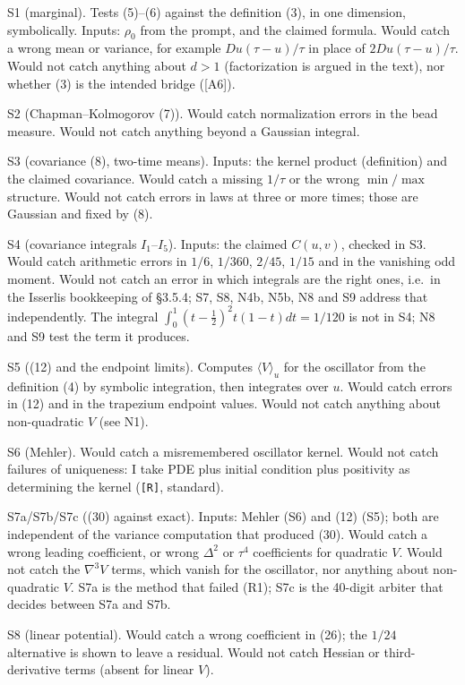 \documentclass[11pt,a4paper]{article}
\begin{document}
S1 (marginal). Tests (5)--(6) against the definition (3), in one dimension, symbolically. Inputs: \(\rho_0\) from the prompt, and the claimed formula. Would catch a wrong mean or variance, for example \(Du(\tau-u)/\tau\) in place of \(2Du(\tau-u)/\tau\). Would not catch anything about \(d>1\) (factorization is argued in the text), nor whether (3) is the intended bridge ({[}A6{]}).

S2 (Chapman--Kolmogorov (7)). Would catch normalization errors in the bead measure. Would not catch anything beyond a Gaussian integral.

S3 (covariance (8), two-time means). Inputs: the kernel product (definition) and the claimed covariance. Would catch a missing \(1/\tau\) or the wrong \(\min/\max\) structure. Would not catch errors in laws at three or more times; those are Gaussian and fixed by (8).

S4 (covariance integrals \(I_1\)--\(I_5\)). Inputs: the claimed \(C(u,v)\), checked in S3. Would catch arithmetic errors in \(1/6\), \(1/360\), \(2/45\), \(1/15\) and in the vanishing odd moment. Would not catch an error in which integrals are the right ones, i.e.~in the Isserlis bookkeeping of §3.5.4; S7, S8, N4b, N5b, N8 and S9 address that independently. The integral \(\int_0^1(t-\frac12)^2t(1-t)dt=1/120\) is not in S4; N8 and S9 test the term it produces.

S5 ((12) and the endpoint limits). Computes \(\langle V\rangle_u\) for the oscillator from the definition (4) by symbolic integration, then integrates over \(u\). Would catch errors in (12) and in the trapezium endpoint values. Would not catch anything about non-quadratic \(V\) (see N1).

S6 (Mehler). Would catch a misremembered oscillator kernel. Would not catch failures of uniqueness: I take PDE plus initial condition plus positivity as determining the kernel (\texttt{[R]}, standard).

S7a/S7b/S7c ((30) against exact). Inputs: Mehler (S6) and (12) (S5); both are independent of the variance computation that produced (30). Would catch a wrong leading coefficient, or wrong \(\Delta^2\) or \(\tau^4\) coefficients for quadratic \(V\). Would not catch the \(\nabla^3V\) terms, which vanish for the oscillator, nor anything about non-quadratic \(V\). S7a is the method that failed (R1); S7c is the 40-digit arbiter that decides between S7a and S7b.

S8 (linear potential). Would catch a wrong coefficient in (26); the \(1/24\) alternative is shown to leave a residual. Would not catch Hessian or third-derivative terms (absent for linear \(V\)).
\end{document}

